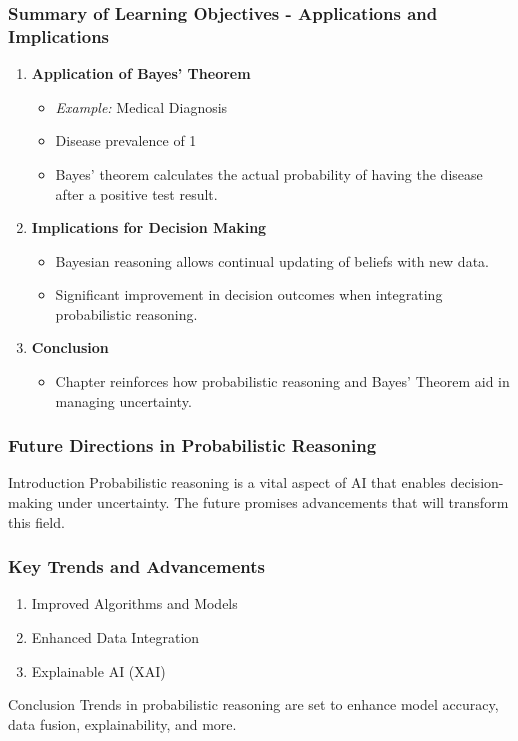 \documentclass[aspectratio=169]{beamer}
\begin{document}
\begin{frame}[fragile]
    \frametitle{Summary of Learning Objectives - Applications and Implications}
    \begin{enumerate}
        \item \textbf{Application of Bayes’ Theorem}
        \begin{itemize}
            \item \textit{Example:} Medical Diagnosis
            \item Disease prevalence of 1%
            \item Bayes' theorem calculates the actual probability of having the disease after a positive test result.
        \end{itemize}
        
        \item \textbf{Implications for Decision Making}
        \begin{itemize}
            \item Bayesian reasoning allows continual updating of beliefs with new data.
            \item Significant improvement in decision outcomes when integrating probabilistic reasoning.
        \end{itemize}

        \item \textbf{Conclusion}
        \begin{itemize}
            \item Chapter reinforces how probabilistic reasoning and Bayes' Theorem aid in managing uncertainty.
        \end{itemize}
    \end{enumerate}
\end{frame}

\begin{frame}[fragile]
    \frametitle{Future Directions in Probabilistic Reasoning}
    \begin{block}{Introduction}
        Probabilistic reasoning is a vital aspect of AI that enables decision-making under uncertainty. The future promises advancements that will transform this field.
    \end{block}
\end{frame}

\begin{frame}[fragile]
    \frametitle{Key Trends and Advancements}
    \begin{enumerate}
        \item Improved Algorithms and Models
        \item Enhanced Data Integration
        \item Explainable AI (XAI)
    \end{enumerate}
    \begin{block}{Conclusion}
        Trends in probabilistic reasoning are set to enhance model accuracy, data fusion, explainability, and more.
    \end{block}
\end{frame}
\end{document}
